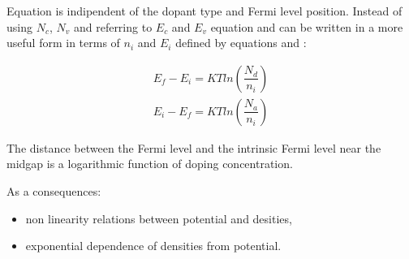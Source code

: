 Equation  is indipendent of the dopant type and Fermi level position.
Instead of using $N_c$, $N_v$ and referring to $E_c$ and $E_v$ equation  and  can be written in a more useful form in terms of $n_i$ and $E_i$ defined by equations  and :

 \begin{align}
 E_f-E_i = KTln\left(\dfrac{N_d}{n_i}\right)  \label{eq: Ef in n-type Ei} \\
 E_i-E_f = KTln\left(\dfrac{N_a}{n_i}\right)  \label{eq: Ef in p-type Ei} 
 \end{align}

\begin{Osservazione}
The distance between the Fermi level and the intrinsic Fermi level near the midgap is a logarithmic function of doping concentration.
\end{Osservazione}

As a consequences:
\begin{itemize}
\item non linearity relations between potential and desities,
\item exponential dependence of densities from potential.
\end{itemize}

